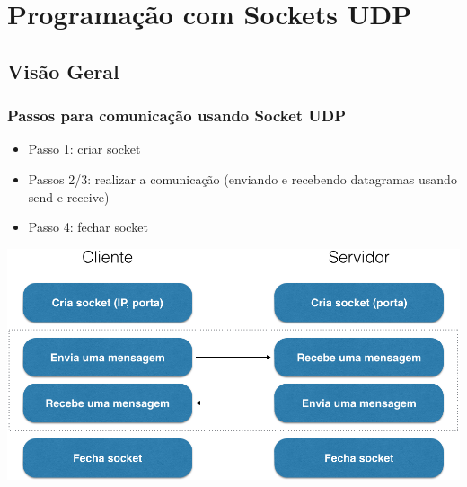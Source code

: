 \documentclass[hyperref={pdfpagelabels=false},table]{beamer}
\begin{document}

\section{Programação com Sockets UDP}
\subsection{Visão Geral}
\begin{frame}[t]
  \frametitle{Passos para comunicação usando Socket UDP}
    \begin{itemize}
     \item Passo 1: criar socket 
	 \item Passos 2/3: realizar a comunicação (enviando e recebendo datagramas usando send e receive)
	 \item Passo 4: fechar socket
    \end{itemize}
	\centering
	\includegraphics[width=0.85\linewidth]{figs/udp2}

\end{frame}
\end{document}
